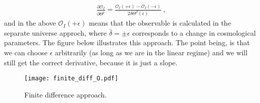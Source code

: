 \documentclass[11pt, oneside]{article}   	%
\newcommand{\obs}{\mathcal{O}}
\begin{document}
\begin{align}
 \frac{\partial \obs_I}{ \partial \Theta^i} = \frac{ \obs_I(+ \epsilon) - \obs_I(- \epsilon)}{2\delta\Theta^I( \epsilon)} ~,
 \end{align} 
and in the above $  \obs_I(+ \epsilon)$ means that the observable is calculated in the separate universe approch, where $\bar{\delta}=\pm\epsilon$ corresponds to a change in cosmological parameters.  The figure below illustrates this approach. The point being, is that we can choose $\epsilon$ arbitrarily (as long as we are in the linear regime) and we will still get the correct derivative, because it is just a slope. 
 
 \begin{figure}[h]
  \caption{Finite difference approach.}
  \centering
    \texttt{[image: finite\_diff\_O.pdf]}
\end{figure}
\end{document}
